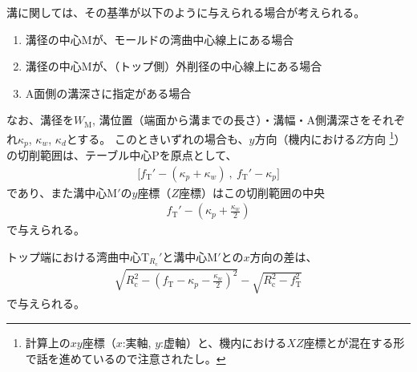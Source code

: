 


溝に関しては、その基準が以下のように与えられる場合が考えられる。
\begin{enumerate}
\item {}溝径の中心Mが、モールドの湾曲中心線上にある場合
\item {}溝径の中心Mが、（トップ側）外削径の中心線上にある場合
\item {}A面側の溝深さに指定がある場合
\end{enumerate}
なお、溝径を$W_\mathrm M$, 溝位置（端面から溝までの長さ）・溝幅・A側溝深さをそれぞれ$\kappa_p$, $\kappa_w$, $\kappa_d$とする。
このときいずれの場合も、$y$方向（機内における$Z$方向
\footnote{計算上の$xy$座標（$x$:実軸, $y$:虚軸）と、機内における$XZ$座標とが混在する形で話を進めているので注意されたし。}）
の切削範囲は、テーブル中心Pを原点として、
\begin{align*}
  \big[f_\mathrm T'-(\kappa_p+\kappa_w)\ ,\ f_\mathrm T'-\kappa_p\big]
\end{align*}
であり、また溝中心M$'$の$y$座標（$Z$座標）はこの切削範囲の中央
\begin{align}
  \label{eq:mizocenterZ}
  f_\mathrm T'-\left(\kappa_p+\frac{\kappa_w}2\right)
\end{align}
で与えられる。



トップ端における湾曲中心T$_{R_\mathrm c}'$と溝中心M$'$との$x$方向の差は、
\begin{align}
  \label{eq:difTopMizoCenter}
  \sqrt{R_\mathrm c^2-\left(f_\mathrm T-\kappa_p-\frac{\kappa_w}2\right)^{\!2}}
  -\sqrt{R_\mathrm c^2-f_\mathrm T^2}
\end{align}
で与えられる。


